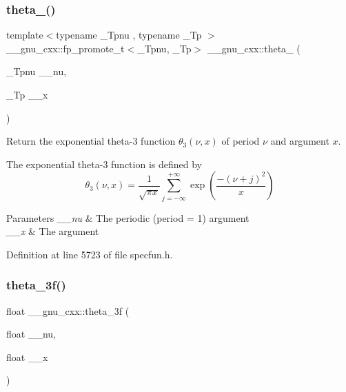 \subsubsection{\texorpdfstring{theta\+\_()}{theta\_3()}}
{\footnotesize\ttfamily template$<$typename \+\_\+\+Tpnu , typename \+\_\+\+Tp $>$ \\
\+\_\+\+\_\+gnu\+\_\+cxx\+::fp\+\_\+promote\+\_\+t$<$\+\_\+\+Tpnu, \+\_\+\+Tp$>$ \+\_\+\+\_\+gnu\+\_\+cxx\+::theta\+\_ (\begin{DoxyParamCaption}\item[{\+\_\+\+Tpnu}]{\+\_\+\+\_\+nu,  }\item[{\+\_\+\+Tp}]{\+\_\+\+\_\+x }\end{DoxyParamCaption})\hspace{0.3cm}{\ttfamily [inline]}}

Return the exponential theta-\/3 function $ \theta_3(\nu,x) $ of period $ \nu $ and argument $ x $.

The exponential theta-\/3 function is defined by \[ \theta_3(\nu,x) = \frac{1}{\sqrt{\pi x}} \sum_{j=-\infty}^{+\infty} \exp\left( \frac{-(\nu+j)^2}{x} \right) \]


\begin{DoxyParams}{Parameters}
{\em \+\_\+\+\_\+nu} & The periodic (period = 1) argument \\
\hline
{\em \+\_\+\+\_\+x} & The argument \\
\hline
\end{DoxyParams}


Definition at line 5723 of file specfun.\+h.

\mbox{\label{group__gnu__math__spec__func_ga9a7c967d2a456f1a6aceee9a53f024b1}} 
\subsubsection{\texorpdfstring{theta\+\_\+3f()}{theta\_3f()}}
{\footnotesize\ttfamily float \+\_\+\+\_\+gnu\+\_\+cxx\+::theta\+\_\+3f (\begin{DoxyParamCaption}\item[{float}]{\+\_\+\+\_\+nu,  }\item[{float}]{\+\_\+\+\_\+x }\end{DoxyParamCaption})\hspace{0.3cm}{\ttfamily [inline]}}

